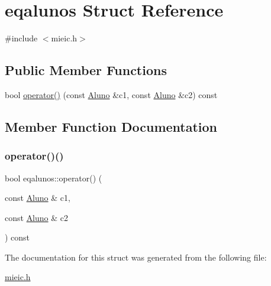 \hypertarget{structeqalunos}{}\section{eqalunos Struct Reference}
\label{structeqalunos}


{\ttfamily \#include $<$mieic.\+h$>$}

\subsection*{Public Member Functions}
\begin{DoxyCompactItemize}
\item 
bool \hyperlink{structeqalunos_a6aa11903b7bf832f90260366ea016290}{operator()} (const \hyperlink{class_aluno}{Aluno} \&c1, const \hyperlink{class_aluno}{Aluno} \&c2) const
\end{DoxyCompactItemize}


\subsection{Member Function Documentation}
\hypertarget{structeqalunos_a6aa11903b7bf832f90260366ea016290}{}\label{structeqalunos_a6aa11903b7bf832f90260366ea016290} 
\subsubsection{\texorpdfstring{operator()()}{operator()()}}
{\footnotesize\ttfamily bool eqalunos\+::operator() (\begin{DoxyParamCaption}\item[{const \hyperlink{class_aluno}{Aluno} \&}]{c1,  }\item[{const \hyperlink{class_aluno}{Aluno} \&}]{c2 }\end{DoxyParamCaption}) const\hspace{0.3cm}{\ttfamily [inline]}}



The documentation for this struct was generated from the following file\+:\begin{DoxyCompactItemize}
\item 
\hyperlink{mieic_8h}{mieic.\+h}\end{DoxyCompactItemize}
